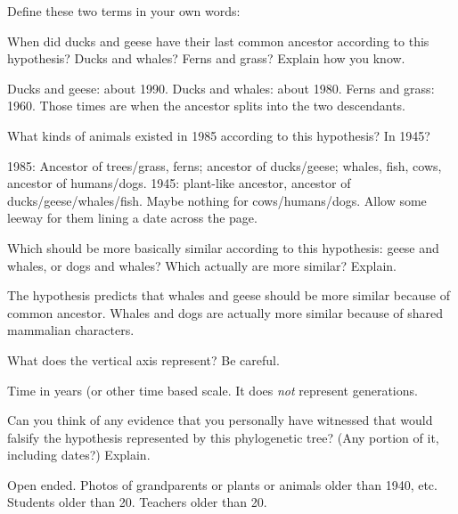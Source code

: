 \documentclass[12pt, addpoints, hidelinks]{exam}
\newcommand*\AnswerBox[2]{%
    \parbox[t][#1]{0.92\textwidth}{%
    \begin{solution}#2\end{solution}}
}
\begin{document}
\begin{questions}

\question[2]
Define these two terms in your own words:

\newpage

\question[2]
When did ducks and geese have their last common ancestor according to
this hypothesis? Ducks and whales? Ferns and grass? Explain how you
know.

\AnswerBox{5\baselineskip}{Ducks and geese: about 1990. Ducks and whales: about 1980. Ferns and grass: 1960. Those times are when the ancestor splits into the two descendants.}

\question[2]
What kinds of animals existed in 1985 according to this hypothesis?
In 1945?

\AnswerBox{5\baselineskip}{1985: Ancestor of trees/grass, ferns; ancestor of ducks/geese; whales, fish, cows, ancestor of humans/dogs. 1945: plant-like ancestor, ancestor of ducks/geese/whales/fish. Maybe nothing for cows/humans/dogs. Allow some leeway for them lining a date across the page.}

\question[2]
Which should be more basically similar according to this hypothesis:
geese and whales, or dogs and whales? Which actually are more similar?
Explain.

\AnswerBox{5\baselineskip}{The hypothesis predicts that whales and geese should be more similar because of common ancestor. Whales and dogs are actually more similar because of shared mammalian characters.}

\question[2]
What does the vertical axis represent? Be careful.

\AnswerBox{5\baselineskip}{Time in years (or other time based scale. It does \emph{not} represent generations.}

\question[2]
Can you think of any evidence that you personally have witnessed that
would falsify the hypothesis represented by this phylogenetic tree? (Any
portion of it, including dates?) Explain.

\AnswerBox{5\baselineskip}{Open ended. Photos of grandparents or plants or animals older than 1940, etc. Students older than 20. Teachers older than 20. }

\end{questions}
\end{document}
